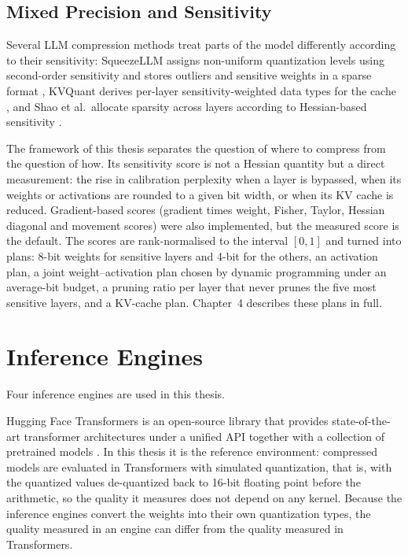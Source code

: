 \subsection{Mixed Precision and Sensitivity}
\label{sec:ch2-mixed}

Several LLM compression methods treat parts of the model differently according to their sensitivity: SqueezeLLM assigns non-uniform quantization levels using second-order sensitivity and stores outliers and sensitive weights in a sparse format \cite{kim2024squeezellm}, KVQuant derives per-layer sensitivity-weighted data types for the cache \cite{hooper2024kvquant}, and Shao et al.\ allocate sparsity across layers according to Hessian-based sensitivity \cite{shao2024sensitivity}.

The framework of this thesis separates the question of where to compress from the question of how. Its sensitivity score is not a Hessian quantity but a direct measurement: the rise in calibration perplexity when a layer is bypassed, when its weights or activations are rounded to a given bit width, or when its KV cache is reduced. Gradient-based scores (gradient times weight, Fisher, Taylor, Hessian diagonal and movement scores) were also implemented, but the measured score is the default. The scores are rank-normalised to the interval $[0, 1]$ and turned into plans: 8-bit weights for sensitive layers and 4-bit for the others, an activation plan, a joint weight--activation plan chosen by dynamic programming under an average-bit budget, a pruning ratio per layer that never prunes the five most sensitive layers, and a KV-cache plan. Chapter~4 describes these plans in full.

\section{Inference Engines}
\label{sec:ch2-engines}

Four inference engines are used in this thesis.

Hugging Face Transformers is an open-source library that provides state-of-the-art transformer architectures under a unified API together with a collection of pretrained models \cite{wolf2020transformers}. In this thesis it is the reference environment: compressed models are evaluated in Transformers with simulated quantization, that is, with the quantized values de-quantized back to 16-bit floating point before the arithmetic, so the quality it measures does not depend on any kernel. Because the inference engines convert the weights into their own quantization types, the quality measured in an engine can differ from the quality measured in Transformers.

